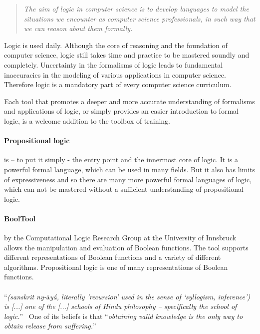 
\begin{quote}
\em The aim of logic in computer science is to develop languages 
to model the situations we encounter as computer science professionals, 
in such way that we can reason about them formally. \cite{Huth:2004:LCS:975331}
\end{quote}

Logic is used daily. Although the core of reasoning and the foundation of computer science, 
logic still takes time and practice to be mastered soundly and completely. 
Uncertainty in the formalisms of logic leads to fundamental inaccuracies 
in the modeling of various applications in computer science. 
Therefore logic is a mandatory part of every computer science curriculum. 

Each tool that promotes a deeper and more accurate understanding of formalisms and applications of logic,
or simply provides an easier introduction to formal logic, 
is a welcome addition to the toolbox of training.


\paragraph{Propositional logic} is – to put it simply - the entry point and the innermost core of logic. 
It is a powerful formal language, which can be used in many fields. 
But it also has limits of expressiveness and so 
there are many more powerful formal languages of logic, 
which can not be mastered without a sufficient understanding  of propositional logic.

\paragraph{BoolTool} by the Computational Logic Research Group at the University of Innsbruck allows the manipulation and evaluation of Boolean functions. The tool supports different representations of Boolean functions and a variety of different algorithms.
Propositional logic is one of many representations of Boolean functions.

\paragraph{\Nyaya} “{\em (sanskrit ny-$\bar{\mbox{a}}$yá, literally 'recursion’  used in the sense of  ‘syllogism, inference’) is [...] one of the [...] schools of Hindu philosophy – specifically the school of logic.}”\ \cite{WIKIPEDIA:NYAYA}
One of its beliefs is that 
“{\em obtaining valid knowledge is the only way  to obtain release from suffering.}”\ \cite{IEP:NYAYA} 

